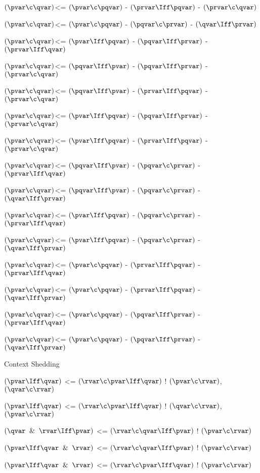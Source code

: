 $(\pvar \c \qvar)$<= $(\pvar \c \pqvar)$ - $(\prvar \Iff \pqvar)$ - $(\prvar \c \qvar)$

$(\pvar \c \qvar)$<= $(\pvar \c \pqvar)$ - $(\pqvar \c \prvar)$ - $(\qvar \Iff \prvar)$

$(\pvar \c \qvar)$<= $(\pvar \Iff \pqvar)$ - $(\pqvar \Iff \prvar)$ - $(\prvar \Iff \qvar)$

$(\pvar \c \qvar)$<= $(\pqvar \Iff \pvar)$ - $(\pqvar \Iff \prvar)$ - $(\prvar \c \qvar)$

$(\pvar \c \qvar)$<= $(\pqvar \Iff \pvar)$ - $(\prvar \Iff \pqvar)$ - $(\prvar \c \qvar)$

$(\pvar \c \qvar)$<= $(\pvar \Iff \pqvar)$ - $(\pqvar \Iff \prvar)$ - $(\prvar \c \qvar)$

$(\pvar \c \qvar)$<= $(\pvar \Iff \pqvar)$ - $(\prvar \Iff \pqvar)$ - $(\prvar \c \qvar)$

$(\pvar \c \qvar)$<= $(\pqvar \Iff \pvar)$ - $(\pqvar \c \prvar)$ - $(\prvar \Iff \qvar)$

$(\pvar \c \qvar)$<= $(\pqvar \Iff \pvar)$ - $(\pqvar \c \prvar)$ - $(\qvar \Iff \prvar)$

$(\pvar \c \qvar)$<= $(\pvar \Iff \pqvar)$ - $(\pqvar \c \prvar)$ - $(\prvar \Iff \qvar)$

$(\pvar \c \qvar)$<= $(\pvar \Iff \pqvar)$ - $(\pqvar \c \prvar)$ - $(\qvar \Iff \prvar)$

$(\pvar \c \qvar)$<= $(\pvar \c \pqvar)$ - $(\prvar \Iff \pqvar)$ - $(\prvar \Iff \qvar)$

$(\pvar \c \qvar)$<= $(\pvar \c \pqvar)$ - $(\prvar \Iff \pqvar)$ - $(\qvar \Iff \prvar)$

$(\pvar \c \qvar)$<= $(\pvar \c \pqvar)$ - $(\pqvar \Iff \prvar)$ - $(\prvar \Iff \qvar)$

$(\pvar \c \qvar)$<= $(\pvar \c \pqvar)$ - $(\pqvar \Iff \prvar)$ - $(\qvar \Iff \prvar)$

\lineb

Context Shedding
\lineb

$(\pvar \Iff \qvar)$ <= $(\rvar \c \pvar \Iff \qvar)$ ! $(\pvar\c\rvar)$,$(\qvar \c \rvar)$ 

$(\pvar \Iff \qvar)$ <= $(\rvar \c \pvar \Iff \qvar)$ ! $(\qvar\c\rvar)$,$(\pvar \c \rvar)$ 

$(\qvar \And \rvar\Iff \pvar)$ <= $(\rvar \c \qvar\Iff\pvar)$ ! $(\pvar \c \rvar)$ 

$(\pvar \Iff \qvar \And \rvar)$ <= $(\rvar \c \qvar\Iff\pvar)$ ! $(\pvar \c \rvar)$ 

$(\pvar \Iff \qvar \And \rvar)$ <= $(\rvar \c \pvar\Iff\qvar)$ ! $(\pvar \c \rvar)$ 

